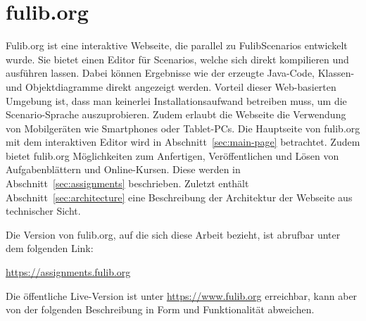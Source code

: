 \chapter{fulib.org}\label{ch:fulib.org}

Fulib.org ist eine interaktive Webseite, die parallel zu FulibScenarios entwickelt wurde.
Sie bietet einen Editor für Scenarios, welche sich direkt kompilieren und ausführen lassen.
Dabei können Ergebnisse wie der erzeugte Java-Code, Klassen- und Objektdiagramme direkt angezeigt werden.
Vorteil dieser Web-basierten Umgebung ist, dass man keinerlei Installationsaufwand betreiben muss, um die Scenario-Sprache auszuprobieren.
Zudem erlaubt die Webseite die Verwendung von Mobilgeräten wie Smartphones oder Tablet-PCs\@.
Die Hauptseite von fulib.org mit dem interaktiven Editor wird in Abschnitt~\ref{sec:main-page} betrachtet.
Zudem bietet fulib.org Möglichkeiten zum Anfertigen, Veröffentlichen und Lösen von Aufgabenblättern und Online-Kursen.
Diese werden in Abschnitt~\ref{sec:assignments} beschrieben.
Zuletzt enthält Abschnitt~\ref{sec:architecture} eine Beschreibung der Architektur der Webseite aus technischer Sicht.

Die Version von fulib.org, auf die sich diese Arbeit bezieht, ist abrufbar unter dem folgenden Link:

\begin{center}
    \url{https://assignments.fulib.org}
\end{center}

Die öffentliche Live-Version ist unter \url{https://www.fulib.org} erreichbar, kann aber von der folgenden Beschreibung in Form und Funktionalität abweichen.




